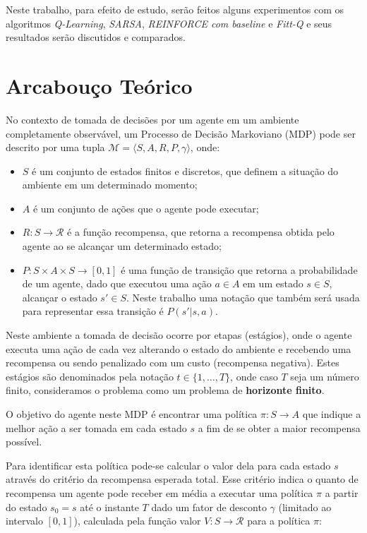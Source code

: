 \documentclass[letterpaper]{article}
\begin{document}
Neste trabalho, para efeito de estudo, serão feitos alguns experimentos com os algoritmos \textit{Q-Learning}, \textit{SARSA}, 
\textit{REINFORCE com baseline} e \textit{Fitt-Q} e seus resultados serão discutidos e comparados.

\section{Arcabouço Teórico}

No contexto de tomada de decisões por um agente em um ambiente completamente observável, um Processo de Decisão Markoviano (MDP)
pode ser descrito por uma tupla $\mathcal{M}=\langle S,A,R,P,\gamma \rangle$, onde:

\begin{itemize}
    \item $S$ é um conjunto de estados finitos e discretos, que definem a situação do ambiente em um determinado momento;
    \item $A$ é um conjunto de ações que o agente pode executar;
    \item $R : S \rightarrow \mathcal{R} $ é a função recompensa, que retorna a recompensa obtida pelo agente ao se alcançar um determinado estado;
    \item $P : S \times A \times S \rightarrow [0, 1]$ é uma função de transição que retorna a probabilidade de um agente, dado que executou uma ação $a \in A$ em um estado $s \in S$, alcançar o estado $s' \in S$. Neste trabalho uma notação que também será usada para representar essa transição é $P(s'|s,a)$.
\end{itemize}

Neste ambiente a tomada de decisão ocorre por etapas (estágios), onde o agente executa uma ação de cada vez alterando o estado 
do ambiente e recebendo uma recompensa ou sendo penalizado com um custo (recompensa negativa). Estes estágios são denominados pela 
notação $t \in \{ 1, \dots, T \} $, onde caso $T$ seja um número finito, consideramos o problema como um problema de \textbf{horizonte finito}.

O objetivo do agente neste MDP é encontrar uma política $\pi : S \rightarrow A$ que indique a melhor ação a ser tomada em cada estado $s$ a fim 
de se obter a maior recompensa possível.

Para identificar esta política pode-se calcular o valor dela para cada estado $s$ através do critério da recompensa esperada total. Esse critério 
indica o quanto de recompensa um agente pode receber em média a executar uma política $\pi$ a partir do estado $s_0 = s$ até o instante $T$ dado um 
fator de desconto $\gamma$ (limitado ao intervalo $[0, 1]$), calculada pela função valor $V : S \rightarrow \mathcal{R} $ para a política $\pi$:
\end{document}
